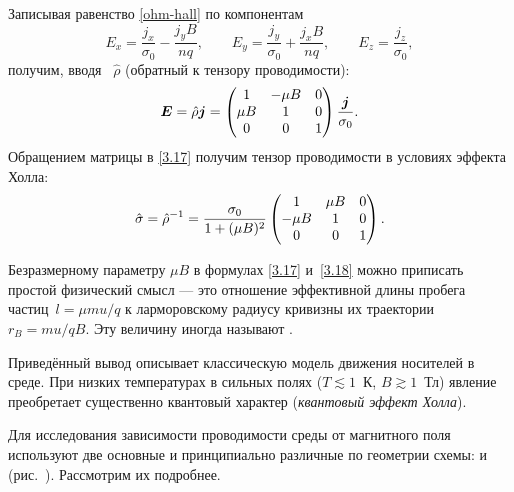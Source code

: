 Записывая равенство \eqref{ohm-hall} по компонентам
\[
E_x = \frac{j_x}{\sigma_0}  -  \frac{j_y B}{nq} ,\qquad
    E_y = \frac{j_y}{\sigma_0} +  \frac{j_xB}{nq} ,\qquad
    E_z = \frac{j_z}{\sigma_0},
\]
получим, вводя
~$\hat{\rho}$ (обратный к тензору
проводимости):
\begin{equation}
    \vec{E}=\hat{\rho}\vec{j}= \left(
    \begin{matrix}
        1 & -\mu B & {0} \\
        \mu B & 1 & {0} \\
        {0} &{0}& 1
    \end{matrix}
    \right)
    \frac{\vec{j}}{\sigma_0}.
    \eqmark{3.17}
\end{equation}
Обращением матрицы в \eqref{3.17} получим тензор проводимости
в условиях эффекта Холла:
\begin{equation}
    \hat{\sigma} = \hat{\rho}^{-1}=
    \frac{\sigma_0}{1+(\mu B)^2}\left(
    \begin{matrix}
        {1} & \mu B & {0} \\
        -\mu B & 1 & {0} \\
        {0} &{0}& 1 \\
    \end{matrix}
    \right).
    \eqmark{3.18}
\end{equation}

Безразмерному параметру $\mu B$ в формулах 
\eqref{3.17} и~\eqref{3.18} можно приписать простой
физический смысл --- это отношение эффективной длины пробега 
частиц~$l= \mu m u/q$ к ларморовскому радиусу кривизны их траектории $r_B=mu/qB$.
Эту величину иногда называют . 

\begin{lab:note}
Приведённый вывод описывает классическую модель движения носителей
в среде. При низких температурах  в сильных полях ($T\lesssim 1$~К, $B\gtrsim1$~Тл)
явление преобретает существенно квантовый характер
(\emph{квантовый эффект Холла}). 
\end{lab:note}



Для исследования зависимости проводимости среды от магнитного поля 
используют две основные и принципиально различные по геометрии схемы: 
 и  (рис.~).
Рассмотрим их подробнее.

